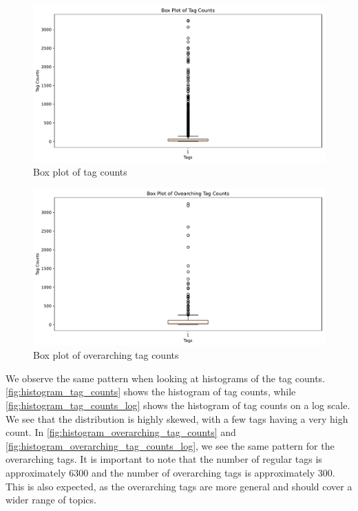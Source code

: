 \begin{figure}[h]
    \centering
    \includegraphics[width=\textwidth]{figures/box_plot_tag_counts.pdf}
    \caption{Box plot of tag counts}
    \label{fig:box_plot_tag_counts}
\end{figure}

\begin{figure}[h]
    \centering
    \includegraphics[width=\textwidth]{figures/box_plot_overarching_tag_counts.pdf}
    \caption{Box plot of overarching tag counts}
    \label{fig:box_plot_overarching_tag_counts}
\end{figure}

We observe the same pattern when looking at histograms of the tag counts. \cref{fig:histogram_tag_counts} shows the histogram of tag counts, while \cref{fig:histogram_tag_counts_log} shows the histogram of tag counts on a log scale. We see that the distribution is highly skewed, with a few tags having a very high count. In \cref{fig:histogram_overarching_tag_counts} and \cref{fig:histogram_overarching_tag_counts_log}, we see the same pattern for the overarching tags. It is important to note that the number of regular tags is approximately 6300 and the number of overarching tags is approximately 300. This is also expected, as the overarching tags are more general and should cover a wider range of topics.

